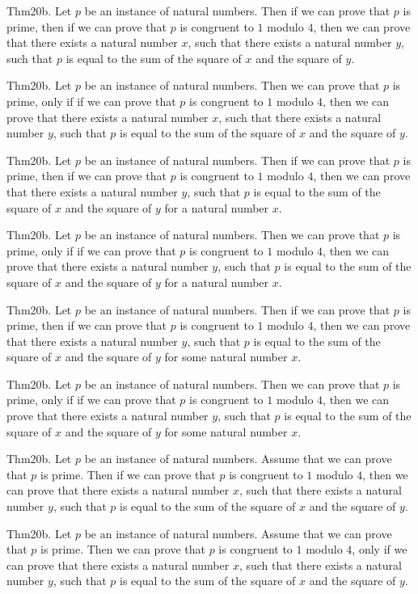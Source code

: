 \documentclass{article}
\begin{document}
Thm20b. Let $p$ be an instance of natural numbers. Then if we can prove that $p$ is prime, then if we can prove that $p$ is congruent to $1$ modulo $4$, then we can prove that there exists a natural number $x$, such that there exists a natural number $y$, such that $p$ is equal to the sum of the square of $x$ and the square of $y$.

Thm20b. Let $p$ be an instance of natural numbers. Then we can prove that $p$ is prime, only if if we can prove that $p$ is congruent to $1$ modulo $4$, then we can prove that there exists a natural number $x$, such that there exists a natural number $y$, such that $p$ is equal to the sum of the square of $x$ and the square of $y$.

Thm20b. Let $p$ be an instance of natural numbers. Then if we can prove that $p$ is prime, then if we can prove that $p$ is congruent to $1$ modulo $4$, then we can prove that there exists a natural number $y$, such that $p$ is equal to the sum of the square of $x$ and the square of $y$ for a natural number $x$.

Thm20b. Let $p$ be an instance of natural numbers. Then we can prove that $p$ is prime, only if if we can prove that $p$ is congruent to $1$ modulo $4$, then we can prove that there exists a natural number $y$, such that $p$ is equal to the sum of the square of $x$ and the square of $y$ for a natural number $x$.

Thm20b. Let $p$ be an instance of natural numbers. Then if we can prove that $p$ is prime, then if we can prove that $p$ is congruent to $1$ modulo $4$, then we can prove that there exists a natural number $y$, such that $p$ is equal to the sum of the square of $x$ and the square of $y$ for some natural number $x$.

Thm20b. Let $p$ be an instance of natural numbers. Then we can prove that $p$ is prime, only if if we can prove that $p$ is congruent to $1$ modulo $4$, then we can prove that there exists a natural number $y$, such that $p$ is equal to the sum of the square of $x$ and the square of $y$ for some natural number $x$.

Thm20b. Let $p$ be an instance of natural numbers. Assume that we can prove that $p$ is prime. Then if we can prove that $p$ is congruent to $1$ modulo $4$, then we can prove that there exists a natural number $x$, such that there exists a natural number $y$, such that $p$ is equal to the sum of the square of $x$ and the square of $y$.

Thm20b. Let $p$ be an instance of natural numbers. Assume that we can prove that $p$ is prime. Then we can prove that $p$ is congruent to $1$ modulo $4$, only if we can prove that there exists a natural number $x$, such that there exists a natural number $y$, such that $p$ is equal to the sum of the square of $x$ and the square of $y$.
\end{document}
